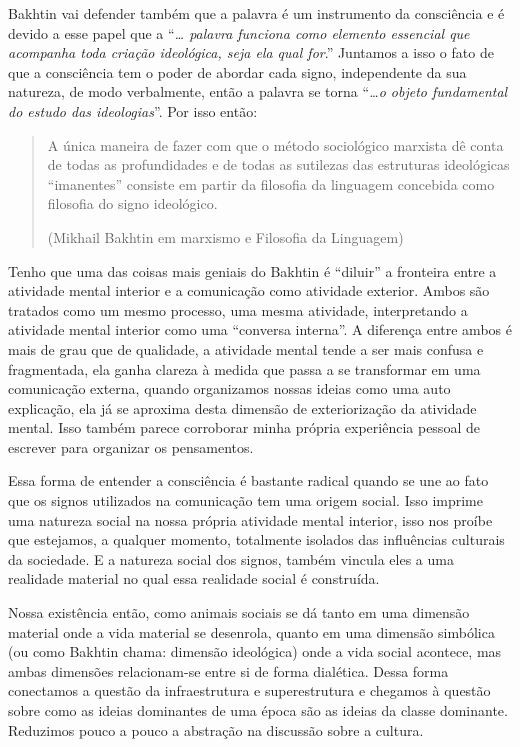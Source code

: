 Bakhtin vai defender também que a palavra é um instrumento da consciência e é devido a esse papel que a “\textit{… palavra funciona como elemento essencial que acompanha toda criação ideológica, seja ela qual for}.” Juntamos a isso o fato de que a consciência tem o poder de abordar cada signo, independente da sua natureza, de modo verbalmente, então a palavra se torna “\textit{…o objeto fundamental do estudo das ideologias}”. Por isso então:

\begin{quote}
A única maneira de fazer com que o método sociológico marxista dê conta de todas as profundidades e de todas as sutilezas das estruturas ideológicas “imanentes” consiste em partir da filosofia da linguagem concebida como filosofia do signo ideológico.

(Mikhail Bakhtin em marxismo e Filosofia da Linguagem)
\end{quote}

Tenho que uma das coisas mais geniais do Bakhtin é “diluir” a fronteira entre a atividade mental interior e a comunicação como atividade exterior. Ambos são tratados como um mesmo processo, uma mesma atividade, interpretando a atividade mental interior como uma “conversa interna”. A diferença entre ambos é mais de grau que de qualidade, a atividade mental tende a ser mais confusa e fragmentada, ela ganha clareza à medida que passa a se transformar em uma comunicação externa, quando organizamos nossas ideias como uma auto explicação, ela já se aproxima desta dimensão de exteriorização da atividade mental. Isso também parece corroborar minha própria experiência pessoal de escrever para organizar os pensamentos.

Essa forma de entender a consciência é bastante radical quando se une ao fato que os signos utilizados na comunicação tem uma origem social. Isso imprime uma natureza social na nossa própria atividade mental interior, isso nos proíbe que estejamos, a qualquer momento, totalmente isolados das influências culturais da sociedade. E a natureza social dos signos, também vincula eles a uma realidade material no qual essa realidade social é construída.

Nossa existência então, como animais sociais se dá tanto em uma dimensão material onde a vida material se desenrola, quanto em uma dimensão simbólica (ou como Bakhtin chama: dimensão ideológica) onde a vida social acontece, mas ambas dimensões relacionam-se entre si de forma dialética. Dessa forma conectamos a questão da infraestrutura e superestrutura e chegamos à questão sobre como as ideias dominantes de uma época são as ideias da classe dominante. Reduzimos pouco a pouco a abstração na discussão sobre a cultura.

